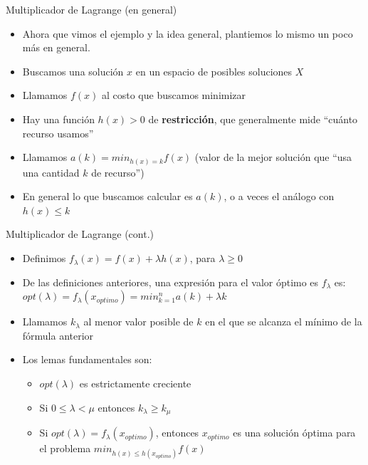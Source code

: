 \documentclass{beamer}
\begin{document}
\begin{frame}{Multiplicador de Lagrange (en general)}
    \begin{itemize}
		\item Ahora que vimos el ejemplo y la idea general, plantiemos lo mismo un poco más en general.
        \item Buscamos una solución $x$ en un espacio de posibles soluciones $X$
        \item Llamamos $f(x)$ al costo que buscamos minimizar
        \item Hay una función $h(x) > 0$ de \textbf{restricción}, que generalmente mide ``cuánto recurso usamos''
        \item Llamamos $a(k) = min_{h(x)=k}{f(x)}$ (valor de la mejor solución que ``usa una cantidad $k$ de recurso'')
        \item En general lo que buscamos calcular es $a(k)$, o a veces el análogo con $h(x) \leq k$
    \end{itemize}
\end{frame}

\begin{frame}{Multiplicador de Lagrange (cont.)}
    \begin{itemize}
		\item Definimos $f_\lambda(x) = f(x) + \lambda h(x)$, para $\lambda \geq 0$
        \item De las definiciones anteriores, una expresión para el valor óptimo es $f_\lambda$ es:
                $opt(\lambda) = f_\lambda(x_{optimo}) = min_{k=1}^{n}{a(k) + \lambda k}$
        \item Llamamos $k_\lambda$ al menor valor posible de $k$ en el que se alcanza el mínimo de la fórmula anterior
        \item Los lemas fundamentales son:
            \begin{itemize}
                \item $opt(\lambda)$ es estrictamente creciente
                \item Si $0 \leq \lambda < \mu$ entonces $k_\lambda \geq k_\mu$
                \item Si $opt(\lambda) = f_\lambda(x_{optimo})$, entonces $x_{optimo}$ es una solución óptima para el problema $min_{h(x) \leq h({x_{optimo}})} f(x)$
            \end{itemize}
    \end{itemize}
\end{frame}
\end{document}
